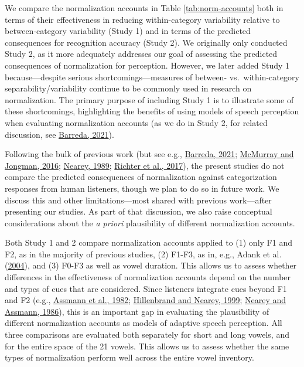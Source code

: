 \documentclass[utf8]{frontiersSCNS}
\begin{document}
We compare the normalization accounts in Table \ref{tab:norm-accounts} both in terms of their effectiveness in reducing within-category variability relative to between-category variability (Study 1) and in terms of the predicted consequences for recognition accuracy (Study 2). We originally only conducted Study 2, as it more adequately addresses our goal of assessing the predicted consequences of normalization for perception. However, we later added Study 1 because---despite serious shortcomings---measures of between- vs.~within-category separability/variability continue to be commonly used in research on normalization. The primary purpose of including Study 1 is to illustrate some of these shortcomings, highlighting the benefits of using models of speech perception when evaluating normalization accounts (as we do in Study 2, for related discussion, see \protect\hyperlink{ref-barreda2021}{Barreda, 2021}).

Following the bulk of previous work (but see e.g., \protect\hyperlink{ref-barreda2021}{Barreda, 2021}; \protect\hyperlink{ref-mcmurray-jongman2016}{McMurray and Jongman, 2016}; \protect\hyperlink{ref-nearey1989}{Nearey, 1989}; \protect\hyperlink{ref-richter2017}{Richter et al., 2017}), the present studies do not compare the predicted consequences of normalization against categorization responses from human listeners, though we plan to do so in future work. We discuss this and other limitations---most shared with previous work---after presenting our studies. As part of that discussion, we also raise conceptual considerations about the \emph{a priori} plausibility of different normalization accounts.

Both Study 1 and 2 compare normalization accounts applied to (1) only F1 and F2, as in the majority of previous studies, (2) F1-F3, as in, e.g., Adank et al. (\protect\hyperlink{ref-adank2004}{2004}), and (3) F0-F3 as well as vowel duration. This allows us to assess whether differences in the effectiveness of normalization accounts depend on the number and types of cues that are considered. Since listeners integrate cues beyond F1 and F2 (e.g., \protect\hyperlink{ref-Assmann1982}{Assmann et al., 1982}; \protect\hyperlink{ref-hillenbrand1999}{Hillenbrand and Nearey, 1999}; \protect\hyperlink{ref-nearey1986}{Nearey and Assmann, 1986}), this is an important gap in evaluating the plausibility of different normalization accounts as models of adaptive speech perception. All three comparisons are evaluated both separately for short and long vowels, and for the entire space of the 21 vowels. This allows us to assess whether the same types of normalization perform well across the entire vowel inventory.
\end{document}
